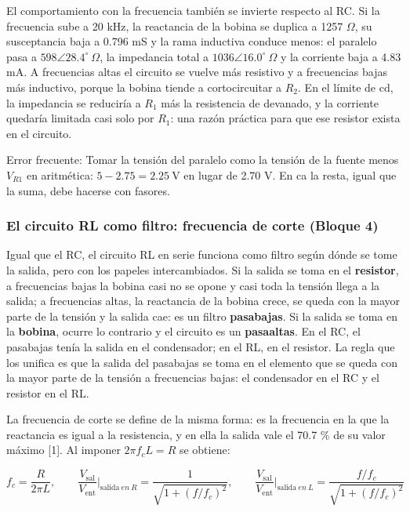 \documentclass[11pt,letterpaper]{article}
\begin{document}
El comportamiento con la frecuencia también se invierte respecto al RC. Si la frecuencia sube a 20 kHz, la reactancia de la bobina se duplica a 1257 \ensuremath{\Omega}, su susceptancia baja a 0.796 mS y la rama inductiva conduce menos: el paralelo pasa a $598 \angle 28.4^\circ\ \Omega$, la impedancia total a $1036 \angle 16.0^\circ\ \Omega$ y la corriente baja a 4.83 mA. A frecuencias altas el circuito se vuelve más resistivo y a frecuencias bajas más inductivo, porque la bobina tiende a cortocircuitar a $R_2$. En el límite de cd, la impedancia se reduciría a $R_1$ más la resistencia de devanado, y la corriente quedaría limitada casi solo por $R_1$: una razón práctica para que ese resistor exista en el circuito.

\begin{nota}{Error frecuente:}
Tomar la tensión del paralelo como la tensión de la fuente menos $V_{R1}$ en aritmética: $5 - 2.75 = 2.25\ \text{V}$ en lugar de 2.70 V. En ca la resta, igual que la suma, debe hacerse con fasores.
\end{nota}

\subsubsection{El circuito RL como filtro: frecuencia de corte (Bloque 4)}

Igual que el RC, el circuito RL en serie funciona como filtro según dónde se tome la salida, pero con los papeles intercambiados. Si la salida se toma en el \textbf{resistor}, a frecuencias bajas la bobina casi no se opone y casi toda la tensión llega a la salida; a frecuencias altas, la reactancia de la bobina crece, se queda con la mayor parte de la tensión y la salida cae: es un filtro \textbf{pasabajas}. Si la salida se toma en la \textbf{bobina}, ocurre lo contrario y el circuito es un \textbf{pasaaltas}. En el RC, el pasabajas tenía la salida en el condensador; en el RL, en el resistor. La regla que los unifica es que la salida del pasabajas se toma en el elemento que se queda con la mayor parte de la tensión a frecuencias bajas: el condensador en el RC y el resistor en el RL.

La frecuencia de corte se define de la misma forma: es la frecuencia en la que la reactancia es igual a la resistencia, y en ella la salida vale el 70.7 \% de su valor máximo [1]. Al imponer $2\pi f_c L = R$ se obtiene:

\begin{equation}
  f_c = \frac{R}{2\pi L}, \qquad \frac{V_{\mathrm{sal}}}{V_{\mathrm{ent}}}\bigg|_{\text{salida}\ en\ R} = \frac{1}{\sqrt{1 + (f/f_c)^{2}}}, \qquad \frac{V_{\mathrm{sal}}}{V_{\mathrm{ent}}}\bigg|_{\text{salida}\ en\ L} = \frac{f/f_c}{\sqrt{1 + (f/f_c)^{2}}}
\end{equation}
\end{document}
